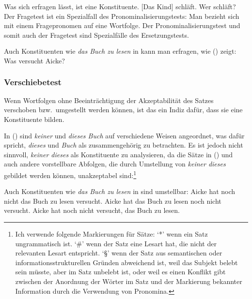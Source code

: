 Was sich erfragen lässt, ist eine Konstituente.
        \eal
        \ex {}[Das Kind] schläft.
        \ex Wer schläft?
        \zl
Der Fragetest ist ein Spezialfall des Pronominalisierungstests: Man bezieht sich mit
einem Fragepronomen auf eine Wortfolge. Der Pronominalisierungstest und somit auch der Fragetest sind Spezialfälle des Ersetzungstests.

Auch Konstituenten wie \emph{das Buch zu lesen} in  kann man erfragen,
wie () zeigt:
\ea
Was versucht Aicke?
\z

\subsubsection{Verschiebetest}

Wenn Wortfolgen ohne Beeinträchtigung der Akzeptabilität des Satzes verschoben
bzw.\ umgestellt werden können, ist das ein Indiz dafür, dass sie eine Konstituente bilden.

        In () sind \emph{keiner} und \emph{dieses Buch} auf verschiedene Weisen angeordnet,
        was dafür spricht, \emph{dieses} und \emph{Buch} als zusammengehörig zu betrachten.
        \eal
        \zl
Es ist jedoch nicht sinnvoll, \emph{keiner dieses} als Konstituente zu analysieren,
da die Sätze in () und auch andere vorstellbare Abfolgen, die durch
Umstellung von \emph{keiner dieses} gebildet werden können, unakzeptabel sind:\footnote{
  Ich verwende folgende Markierungen für Sätze: `*'\is{*} wenn ein Satz ungrammatisch ist.
  `\#'\is{\#} wenn der Satz eine Lesart hat, die nicht der relevanten Lesart entspricht.
  `\S'\is{\S} wenn der Satz aus semantischen oder informationsstrukturellen Gründen abweichend ist,
  \zb weil das Subjekt belebt sein müsste, aber im Satz unbelebt ist, oder weil es einen
  Konflikt gibt zwischen der Anordnung der Wörter im Satz und der Markierung bekannter
  Information durch die Verwendung von Pronomina.%
}
\eal
{}
\zl

\noindent
Auch Konstituenten wie \emph{das Buch zu lesen} in 
sind umstellbar:
\eal
\ex Aicke hat noch nicht das Buch zu lesen versucht.
\ex Aicke hat das Buch zu lesen noch nicht versucht.
\ex Aicke hat noch nicht versucht, das Buch zu lesen.
\zl
{}

